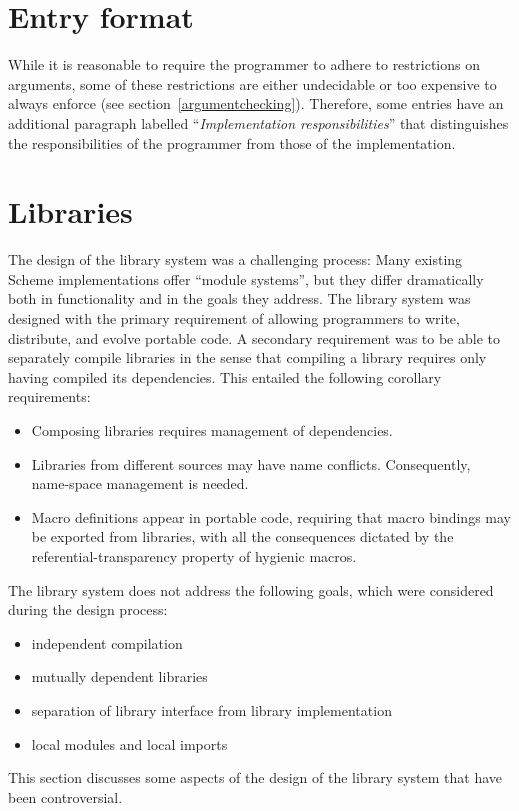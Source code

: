 \documentclass[twoside,twocolumn]{algol60}
\begin{document}
\chapter{Entry format}

While it is reasonable to require the programmer to adhere to
restrictions on arguments, some of these restrictions are either
undecidable or too expensive to always enforce (see
section~\ref{argumentchecking}).  Therefore, some entries have
an additional paragraph labelled ``\textit{Implementation
  responsibilities}'' that distinguishes the responsibilities of the
programmer from those of the implementation.

\chapter{Libraries}

The design of the library system was a challenging process: Many
existing Scheme implementations offer ``module systems'', but they
differ dramatically both in functionality and in the goals they
address.  The library system was designed with the primary
requirement of allowing programmers to write, distribute, and evolve
portable code.  A secondary requirement was to be able to separately
compile libraries in the sense that compiling a library requires only
having compiled its dependencies.  This entailed the following
corollary requirements:
%
\begin{itemize}
\item Composing libraries requires management of dependencies.
\item Libraries from different sources may have name conflicts.
  Consequently, name-space management is needed.
\item Macro definitions appear in portable code, requiring that macro
  bindings may be exported from libraries, with all the consequences
  dictated by the referential-transparency property of hygienic
  macros.
\end{itemize}
%
The library system does not address the following goals, which were
considered during the design process:
%
\begin{itemize}
\item independent compilation
\item mutually dependent libraries
\item separation of library interface from library implementation
\item local modules and local imports
\end{itemize}
%
This section discusses some aspects of the design of the library
system that have been controversial.
\end{document}
